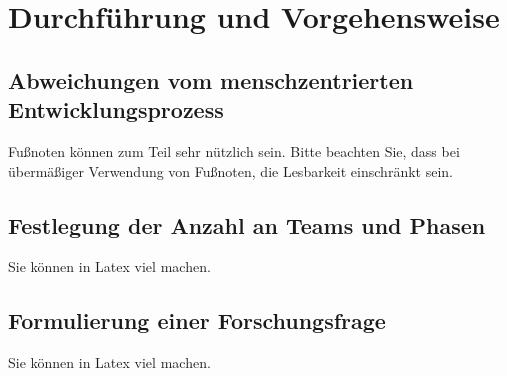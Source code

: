 \chapter{Durchführung und Vorgehensweise}
\label{cha:durchfuehrung_und_vorgehensweise}

\section{Abweichungen vom menschzentrierten Entwicklungsprozess}
\label{sec:abweichungen_menschzentriert}
Fußnoten können zum Teil sehr nützlich sein. Bitte beachten Sie, dass bei übermäßiger Verwendung von Fußnoten, die Lesbarkeit einschränkt sein.

\section{Festlegung der Anzahl an Teams und Phasen}
\label{sub:festlegung_anzahl_teams_phase}
Sie können in Latex viel machen.

\section{Formulierung einer Forschungsfrage}
\label{sub:formulierung_forschungsfrage}
Sie können in Latex viel machen.
